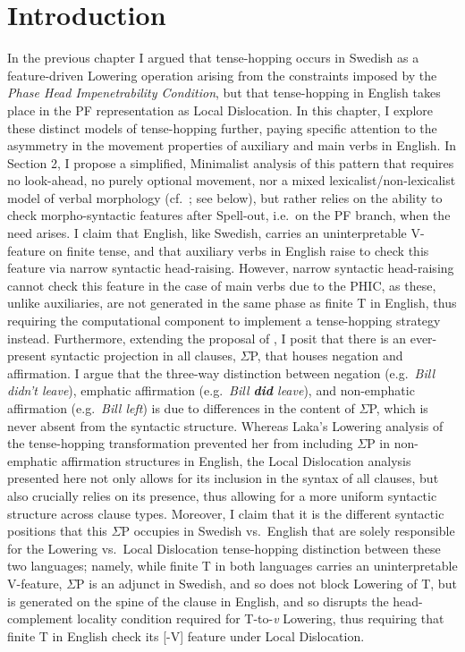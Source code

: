 \section{Introduction}
In the previous chapter I argued that tense-hopping occurs in Swedish as a feature-driven Lowering operation arising from the constraints imposed by the \textit{Phase Head Impenetrability Condition}, but that tense-hopping in English takes place in the PF representation as Local Dislocation. In this chapter, I explore these distinct models of tense-hopping further, paying specific attention to the asymmetry in the movement properties of auxiliary and main verbs in English. In Section 2, I propose a simplified, Minimalist analysis of this pattern that requires no look-ahead, no purely optional movement, nor a mixed lexicalist/non-lexicalist model of verbal morphology (cf.\ ; see below), but rather relies on the ability to check morpho-syntactic features after Spell-out, i.e.\ on the PF branch, when the need arises. I claim that English, like Swedish, carries an uninterpretable V-feature on finite tense, and that auxiliary verbs in English raise to check this feature via narrow syntactic head-raising. However, narrow syntactic head-raising cannot check this feature in the case of main verbs due to the PHIC, as these, unlike auxiliaries, are not generated in the same phase as finite T in English, thus requiring the computational component to implement a tense-hopping strategy instead. Furthermore, extending the proposal of \citet{laka1990}, I posit that there is an ever-present syntactic projection in all clauses, $\Sigma$P, that houses negation and affirmation. I argue that the three-way distinction between negation (e.g.\ \textit{Bill didn't leave}), emphatic affirmation (e.g.\ \textit{Bill \textbf{did} leave}), and non-emphatic affirmation (e.g.\ \textit{Bill left}) is due to differences in the content of $\Sigma$P, which is never absent from the syntactic structure. Whereas Laka's Lowering analysis of the tense-hopping transformation prevented her from including $\Sigma$P in non-emphatic affirmation structures in English, the Local Dislocation analysis presented here not only allows for its inclusion in the syntax of all clauses, but also crucially relies on its presence, thus allowing for a more uniform syntactic structure across clause types. Moreover, I claim that it is the different syntactic positions that this $\Sigma$P occupies in Swedish vs.\ English that are solely responsible for the Lowering vs.\ Local Dislocation tense-hopping distinction between these two languages; namely, while finite T in both languages carries an uninterpretable V-feature, $\Sigma$P is an adjunct in Swedish, and so does not block Lowering of T, but is generated on the spine of the clause in English, and so disrupts the head-complement locality condition required for T-to-\textit{v} Lowering, thus requiring that finite T in English check its [-V] feature under Local Dislocation.

